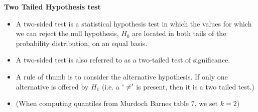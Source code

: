 \documentclass[a4paper,12pt]{article}
\begin{document}
\textbf{Two Tailed Hypothesis test}
\begin{itemize}
	\item
	A two-sided test is a statistical hypothesis test in which the values for which we can reject the null hypothesis, $H_0$ are located in both tails of the probability distribution, on an equal basis.
	\item A two-sided test is also referred to as a two-tailed test of significance.
	\item A rule of thumb is to consider the alternative hypothesis.  If only one alternative is offered by $H_1$ (i.e. a $`\neq'$ is present, then it is a two tailed test.)
	\item (When computing quantiles from Murdoch Barnes table 7, we set $k=2$)
	
\end{itemize}
\end{document}

